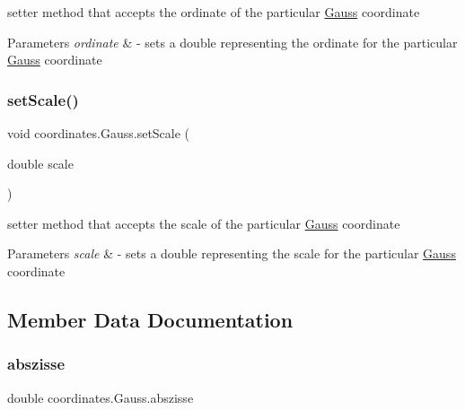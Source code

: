 setter method that accepts the ordinate of the particular \hyperlink{classcoordinates_1_1_gauss}{Gauss} coordinate 


\begin{DoxyParams}{Parameters}
{\em ordinate} & -\/ sets a double representing the ordinate for the particular \hyperlink{classcoordinates_1_1_gauss}{Gauss} coordinate \\
\hline
\end{DoxyParams}
\mbox{\label{classcoordinates_1_1_gauss_a5f0cc370abdab913a51a7395bc54ff24}} 
\subsubsection{\texorpdfstring{set\+Scale()}{setScale()}}
{\footnotesize\ttfamily void coordinates.\+Gauss.\+set\+Scale (\begin{DoxyParamCaption}\item[{double}]{scale }\end{DoxyParamCaption})}



setter method that accepts the scale of the particular \hyperlink{classcoordinates_1_1_gauss}{Gauss} coordinate 


\begin{DoxyParams}{Parameters}
{\em scale} & -\/ sets a double representing the scale for the particular \hyperlink{classcoordinates_1_1_gauss}{Gauss} coordinate \\
\hline
\end{DoxyParams}


\subsection{Member Data Documentation}
\mbox{\label{classcoordinates_1_1_gauss_a9bd37a096f53a9e443570ec5748f95d8}} 
\subsubsection{\texorpdfstring{abszisse}{abszisse}}
{\footnotesize\ttfamily double coordinates.\+Gauss.\+abszisse\hspace{0.3cm}{\ttfamily [private]}}

